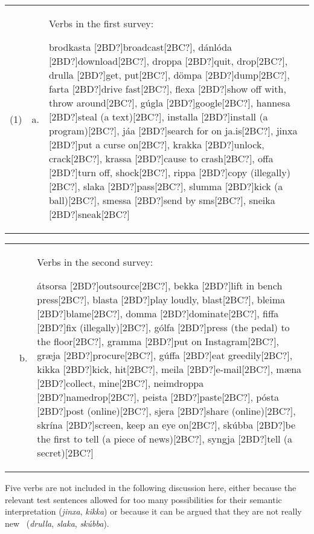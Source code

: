 \documentclass[12pt]{article}
\newenvironment{styleStandard}{\setlength\leftskip{0cm}\setlength\rightskip{0cm plus 1fil}\setlength\parindent{0cm}\setlength\parfillskip{0pt plus 1fil}\setlength\parskip{0in plus 1pt}\writerlistparindent\writerlistleftskip\leavevmode\normalfont\normalsize\writerlistlabel\ignorespaces}{\unskip\vspace{0.111in plus 0.0111in}\par}
\newcommand\writerlistleftskip{}
\newcommand\writerlistparindent{}
\newcommand\writerlistlabel{}
\begin{document}
\begin{flushleft}
\tablefirsthead{}
\tablehead{}
\tabletail{}
\tablelasttail{}
\begin{supertabular}{m{0.31505984in}m{0.23655984in}m{3.9566598in}}
(1) &
a. &
Verbs in the first survey: 

brodkasta [2BD?]broadcast[2BC?], dánlóda [2BD?]download[2BC?], droppa [2BD?]quit, drop[2BC?], drulla [2BD?]get, put[2BC?], dömpa [2BD?]dump[2BC?], farta [2BD?]drive fast[2BC?], flexa [2BD?]show off with, throw around[2BC?], gúgla [2BD?]google[2BC?], hannesa [2BD?]steal (a text)[2BC?], installa [2BD?]install (a program)[2BC?], jáa [2BD?]search for on ja.is[2BC?], jinxa [2BD?]put a curse on[2BC?], krakka [2BD?]unlock, crack[2BC?], krassa [2BD?]cause to crash[2BC?], offa [2BD?]turn off, shock[2BC?], rippa [2BD?]copy (illegally)[2BC?], slaka [2BD?]pass[2BC?], slumma [2BD?]kick (a ball)[2BC?], smessa [2BD?]send by sms[2BC?], sneika [2BD?]sneak[2BC?]\\
\end{supertabular}
\end{flushleft}
\begin{flushleft}
\tablefirsthead{}
\tablehead{}
\tabletail{}
\tablelasttail{}
\begin{supertabular}{m{0.31505984in}m{0.23655984in}m{3.9566598in}}
 &
b. &
Verbs in the second survey: 

átsorsa [2BD?]outsource[2BC?], bekka [2BD?]lift in bench press[2BC?], blasta [2BD?]play loudly, blast[2BC?], bleima [2BD?]blame[2BC?], domma [2BD?]dominate[2BC?], fiffa [2BD?]fix (illegally)[2BC?], gólfa [2BD?]press (the pedal) to the floor[2BC?], gramma [2BD?]put on Instagram[2BC?], græja [2BD?]procure[2BC?], gúffa [2BD?]eat greedily[2BC?], kikka [2BD?]kick, hit[2BC?], meila [2BD?]e-mail[2BC?], mæna [2BD?]collect, mine[2BC?], neimdroppa [2BD?]namedrop[2BC?], peista [2BD?]paste[2BC?], pósta [2BD?]post (online)[2BC?], sjera [2BD?]share (online)[2BC?], skrína [2BD?]screen, keep an eye on[2BC?], skúbba [2BD?]be the first to tell (a piece of news)[2BC?], syngja [2BD?]tell (a secret)[2BC?]\\
\end{supertabular}
\end{flushleft}
\begin{styleStandard}
Five verbs are not included in the following discussion here, either because the relevant test sentences allowed for too many possibilities for their semantic interpretation (\textit{jinxa}, \textit{kikka}) or because it can be argued that they are not really new \ (\textit{drulla}, \textit{slaka}, \textit{skúbba}). 
\end{styleStandard}
\end{document}
